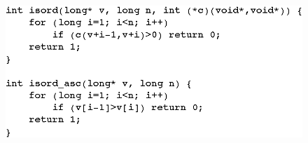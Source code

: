 

\ifdefined\noauthorea
\begin{figure}[t]
\begin{center}
\includegraphics[width=0.9\columnwidth]{figures/isord-example/isord.eps}
\caption{\protect}
\end{center}
\end{figure}
\fi

